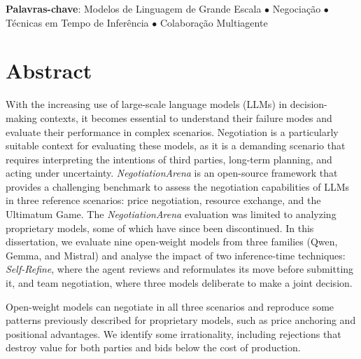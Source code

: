 \vspace{\fill}
\begin{flushleft}
{\Large \textbf{Palavras-chave}:} 
Modelos de Linguagem de Grande Escala \(\bullet\) 
Negociação \(\bullet\)
Técnicas em Tempo de Inferência \(\bullet\)
Colaboração Multiagente

\end{flushleft}
\vspace*{24mm}

\acresetall %

\chapter*{Abstract}

With the increasing use of large-scale language models (LLMs) in decision-making contexts, it becomes essential to understand their failure modes and evaluate their performance in complex scenarios. Negotiation is a particularly suitable context for evaluating these models, as it is a demanding scenario that requires interpreting the intentions of third parties, long-term planning, and acting under uncertainty. \textit{NegotiationArena} is an open-source framework that provides a challenging benchmark to assess the negotiation capabilities of LLMs in three reference scenarios: price negotiation, resource exchange, and the Ultimatum Game. The \textit{NegotiationArena} evaluation was limited to analyzing proprietary models, some of which have since been discontinued. In this dissertation, we evaluate nine open-weight models from three families (Qwen, Gemma, and Mistral) and analyse the impact of two inference-time techniques: \textit{Self-Refine}, where the agent reviews and reformulates its move before submitting it, and team negotiation, where three models deliberate to make a joint decision.

Open-weight models can negotiate in all three scenarios and reproduce some patterns previously described for proprietary models, such as price anchoring and positional advantages. We identify some irrationality, including rejections that destroy value for both parties and bids below the cost of production.

